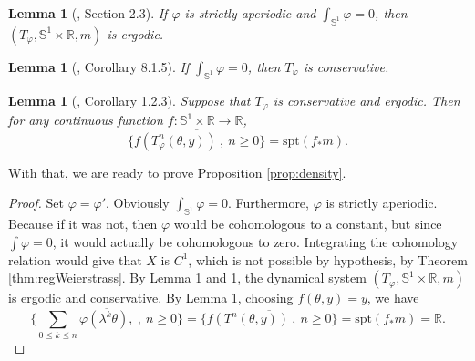 \documentclass[11pt]{amsart}
\renewcommand{\phi}{\varphi}
\theoremstyle{plain}
\newtheorem{lemma}[theorem]{Lemma}
\theoremstyle{definition}
\numberwithin{equation}{section}
\begin{document}
\begin{lemma}[\cite{Gu89}, Section 2.3]\label{lem:ap-erg}
If $\phi$ is strictly aperiodic and $\int_{\mathbb{S}^1} \phi =0$, then $(T_\phi,\mathbb{S}^1 \times \mathbb{R},m)$ is ergodic.
\end{lemma}

\begin{lemma}[\cite{Aa97}, Corollary 8.1.5]\label{lem:cons}
If $\int_{\mathbb{S}^1} \phi = 0$, then $T_\phi$ is conservative.
\end{lemma}



\begin{lemma}[\cite{Aa97}, Corollary 1.2.3]\label{lem:dens}
Suppose that $T_\phi$ is conservative and ergodic. Then for any continuous function $f:\mathbb{S}^1 \times \mathbb{R} \rightarrow \mathbb{R}$, $$ \overline{\{ f(T_\phi^n(\theta,y)) \ , \ n \geq 0\} } = \text{spt}(f_* m). $$
\end{lemma}

With that, we are ready to prove Proposition \ref{prop:density}.

\begin{proof}
Set $\phi = \varphi'$. Obviously $\int_{\mathbb{S}^1} \phi = 0$. Furthermore, $\phi$ is strictly aperiodic. Because if it was not, then $\phi$ would be cohomologous to a constant, but since $\int \phi =0$, it would actually be cohomologous to zero. Integrating the cohomology relation would give that $X$ is $C^1$, which is not possible by hypothesis, by Theorem \ref{thm:regWeierstrass}. By Lemma \ref{lem:ap-erg} and \ref{lem:cons}, the dynamical system $(T_\phi,\mathbb{S}^1 \times \mathbb{R}, m)$ is ergodic and conservative. By Lemma \ref{lem:dens}, choosing $f(\theta,y)=y$, we have $$ \overline{\{ \sum_{0\leq k \leq n} \phi(\lambda^k \theta) , \ , \ n \geq 0 \}} =  \overline{\{ f(T^n(\theta,y)) \ , \ n \geq 0\} } = \text{spt}(f_* m) = \mathbb{R}. $$
\end{proof}
\end{document}
